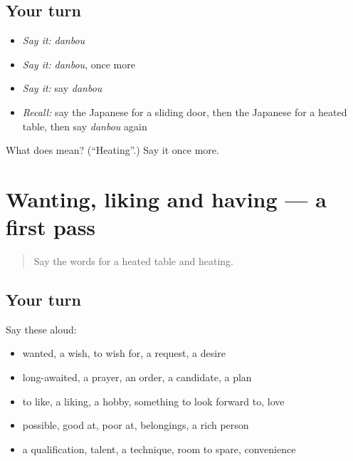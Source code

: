 \subsection*{Your turn}
\begin{itemize}
\raggedright
  \item \emph{Say it:} \emph{danbou}
  \item \emph{Say it:} \emph{danbou}, once more
  \item \emph{Say it:} say \emph{danbou}
  \item \emph{Recall:} say the Japanese for a sliding door, then the Japanese for a heated table, then say \emph{danbou} again
\end{itemize}

\begin{tcolorbox}[breakable,colback=teal!4,colframe=teal!35!black,title={Before you move on}]
What does  mean? (\textquotedblleft{}Heating\textquotedblright{}.) Say it once more.
\end{tcolorbox}
\section[(dialogue)]{Wanting, liking and having — a first pass}

\label{lesson:JA-R101-first-pass-wanting-liking-and-having}



\begin{quote}
Say the words for a heated table and heating.
\end{quote}

\subsection*{Your turn}
Say these aloud:

\begin{itemize}
\raggedright
  \item wanted, a wish, to wish for, a request, a desire
  \item long-awaited, a prayer, an order, a candidate, a plan
  \item to like, a liking, a hobby, something to look forward to, love
  \item possible, good at, poor at, belongings, a rich person
  \item a qualification, talent, a technique, room to spare, convenience
\end{itemize}

